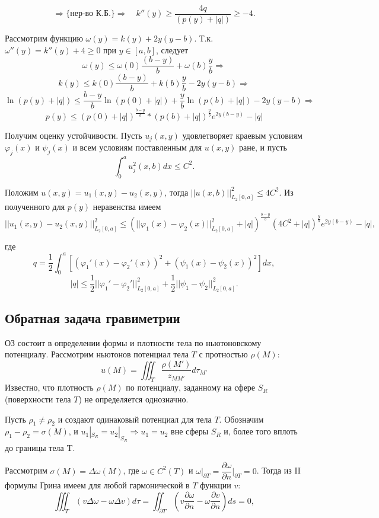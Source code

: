 \documentclass{article}
\begin{document}
\[
	\Rightarrow \{\text{нер-во К.Б.}\} \Rightarrow \quad 
	k''(y) \geqslant \dfrac{4q}{(p(y) + |q|)} \geqslant -4.
\]

Рассмотрим функцию $\omega(y) = k(y) + 2y(y-b)$. Т.к. $\omega '' (y) = k''(y) + 4 \geqslant 0 $ при $y \in [a,b]$, следует
\[
	\omega(y) \leqslant \omega(0)\dfrac{(b-y)}{b} + \omega(b) \dfrac{y}{b} \Rightarrow
\]
\[
	k(y) \leqslant k(0)\dfrac{(b-y)}{b} + k(b)\dfrac{y}{b} - 2y(y-b) \Rightarrow
\]
\[
	\ln (p(y) +|q|) \leqslant \dfrac{b-y}{b} \ln (p(0) + |q|) + \frac{y}{b} \ln(p(b) +|q|) - 2y(y-b) \Rightarrow
\]
\[
	p(y) \leqslant (p(0) + |q|)^{\frac{b-y}{b}} * (p(b) +|q|)^{\frac{y}{b}} e^{2y(b-y)} - |q|
\]

Получим оценку устойчивости.
Пусть $u_j(x,y)$ удовлетворяет краевым условиям $\varphi_j(x)$ и $\psi_j(x)$ и всем условиям поставленным для $u(x,y)$ ране, и пусть
\[
	\int_0^a u_j^2(x,b)dx \leqslant C^2.
\]

Положим $u(x,y) = u_1(x,y) - u_2(x,y)$, тогда  $|| u(x,b)||_{L_2[0,a]}^2 \leqslant 4 C^2$.
Из полученного для $p(y)$ неравенства имеем
\[
	||u_1(x,y) - u_2(x,y) ||_{L_2[0,a]}^2 \leqslant (|| \varphi_1(x) - \varphi_2(x)||_{L_2[0,a]}^2 + |q|) ^{\frac{b-y}{b}} 
	(4C^2 +|q|)^{\frac{y}{b}} e^{2y(b-y)} - |q|,
\]

где
\[
	q = \dfrac{1}{2} \int_0^a [(\varphi_1'(x) - \varphi_2'(x))^2 + (\psi_1(x) - \psi_2(x))^2 ] dx,
\]
\[
	|q| \leqslant \dfrac{1}{2} ||\varphi_1' - \varphi_2'||_{L_2[0,a]}^2 + \dfrac{1}{2} ||\psi_1 - \psi_2||_{L_2[0,a]}^2.
\]

\newpage
\subsection*{ Обратная задача гравиметрии}

ОЗ состоит в определении формы и плотности тела по ньютоновскому потенциалу. 
Рассмотрим ньютонов потенциал тела $T$ с протностью $\rho(M)$:
\[
	u(M) = \iiint_T \dfrac{\rho(M')}{z_{MM'}}d\tau_{M'}
\]
Известно, что плотность $\rho(M)$ по потенциалу, заданному на сфере $S_R$ (поверхности тела $T$) не определяется однозначно.

Пусть $\rho_1 \neq \rho_2$ и создают одинаковый потенциал для тела $T$. 
Обозначим $\rho_1 - \rho_2 = \sigma(M)$, и $u_1|_{S_R} = u_2|_{S_R} \Rightarrow u_1 = u_2$ вне сферы $S_R$ и, более того вплоть до границы тела T.

Рассмотрим $\sigma(M) = \Delta \omega(M)$, где $ \omega \in C^2(T)$ и $\omega|_{\partial T} = \dfrac{\partial \omega}{\partial n} \bigg|_{\partial T} = 0$. 
Тогда из II формулы Грина имеем для любой гармонической в $T$ функции $v$: 
\[
	\iiint_T (v \Delta \omega - \omega \Delta v) d\tau =
	\iint_{\partial T} (v \dfrac{\partial \omega}{\partial n} -
	\omega \dfrac{\partial v}{\partial n} ) ds = 0, 
\]
\end{document}

